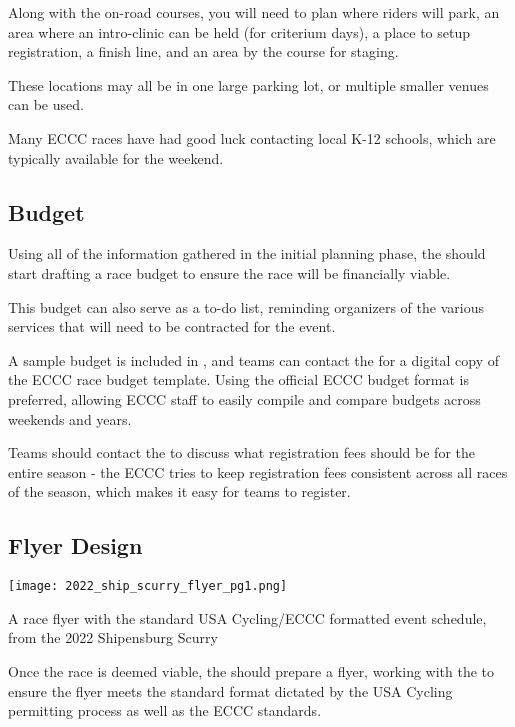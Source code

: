 Along with the on-road courses, you will need to plan where riders will park,
an area where an intro-clinic can be held (for criterium days),
a place to setup registration,
a finish line,
and an area by the course for staging.

These locations may all be in one large parking lot, or multiple smaller venues can be used.

Many ECCC races have had good luck contacting local K-12 schools, which are typically available for the weekend.

\subsection{Budget}

Using all of the information gathered in the initial planning phase, the  should start drafting a race budget
to ensure the race will be financially viable.

This budget can also serve as a to-do list, reminding organizers of the various services that will need to be contracted for the event.

A sample budget is included in , and teams can contact the 
for a digital copy of the ECCC race budget template.
Using the official ECCC budget format is preferred, allowing ECCC staff to easily compile and compare budgets across weekends and years.

Teams should contact the  to discuss what registration fees should be for the entire season -
the ECCC tries to keep registration fees consistent across all races of the season, which makes it easy for teams to register.

\subsection{Flyer Design}

\begin{marginfigure}
  \texttt{[image: 2022\_ship\_scurry\_flyer\_pg1.png]}
  \caption[An example race flyer]{A race flyer with the standard USA Cycling/ECCC formatted event schedule, from the 2022 Shipensburg Scurry}
\end{marginfigure}

Once the race is deemed viable, the  should prepare a flyer, working with the 
to ensure the flyer meets the standard format dictated by the USA Cycling permitting process as well as the ECCC standards.

